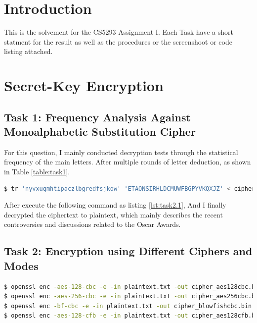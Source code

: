 \documentclass[a4paper]{article}
\begin{document}

{\hypersetup{hidelinks}
\tableofcontents
}
\newpage
\section{Introduction}
This is the solvement for the CS5293 Assignment I. Each Task have a short statment for the result as well as the procedures or the screenshoot or code listing attached.

\section{Secret-Key Encryption}

\subsection{Task 1: Frequency Analysis Against Monoalphabetic Substitution Cipher}\label{sec:task1}

For this question, I mainly conducted decryption tests through the statistical frequency of the main letters. After multiple rounds of letter deduction, as shown in Table \ref{table:task1}. 



\begin{lstlisting}[caption={Decrypt Code}, label={lst:task2.1},language=BASH,breaklines=true]
$ tr 'nyvxuqmhtipaczlbgredfsjkow' 'ETAONSIRHLDCMUWFBGPYVKQXJZ' < ciphertext.txt > plaintext.txt
\end{lstlisting}

After execute the following command as listing \ref{lst:task2.1}, And I finally decrypted the ciphertext to plaintext, which mainly describes the recent controversies and discussions related to the Oscar Awards.

\subsection{Task 2: Encryption using Different Ciphers and Modes}

\begin{lstlisting}[caption={TASK\ 2.2\ Command\ Line},label={lst:task2.2},language=BASH,breaklines=true]
$ openssl enc -aes-128-cbc -e -in plaintext.txt -out cipher_aes128cbc.bin -K 00112233445566778889aabbccddeeff -iv 0102030405060708 # aes-128-cbc encryption
$ openssl enc -aes-256-cbc -e -in plaintext.txt -out cipher_aes256cbc.bin -K 00112233445566778889aabbccddeeff -iv 0102030405060708 # aes-256-cbc encryption
$ openssl enc -bf-cbc -e -in plaintext.txt -out cipher_blowfishcbc.bin -K 00112233445566778889aabbccddeeff -iv 0102030405060708 # blowfish encryption
$ openssl enc -aes-128-cfb -e -in plaintext.txt -out cipher_aes128cfb.bin -K 00112233445566778889aabbccddeeff -iv 0102030405060708 # aes-128-cfb encryption
\end{lstlisting}
\end{document}
